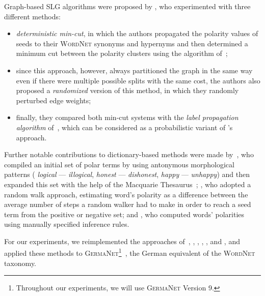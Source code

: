 Graph-based SLG algorithms were proposed by \citet{Rao:09}, who
experimented with three different methods:
\begin{itemize}
\item\emph{deterministic min-cut}, in which the authors propagated the
  polarity values of seeds to their \textsc{WordNet} synonyms and
  hypernyms and then determined a minimum cut between the polarity
  clusters using the algorithm of~\citet{Blum:01};
\item since this approach, however, always partitioned the graph in
  the same way even if there were multiple possible splits with the
  same cost, the authors also proposed a \emph{randomized} version of
  this method, in which they randomly perturbed edge weights;
\item finally, they compared both min-cut systems with the \emph{label
  propagation algorithm} of~\citet{Zhu:02}, which can be considered as
  a probabilistic variant of \citeauthor{Blair-Goldensohn:08}'s
  approach.
\end{itemize}

Further notable contributions to dictionary-based methods were made
by~\citet{Mohammad:09}, who compiled an initial set of polar terms by
using antonymous morphological patterns (\eg{} \emph{logical} ---
\emph{illogical}, \emph{honest} --- \emph{dishonest}, \emph{happy} ---
\emph{unhappy}) and then expanded this set with the help of the
Macquarie Thesaurus~\cite{Bernard:86}; \citet{Awadallah:10}, who
adopted a random walk approach, estimating word's polarity as a
difference between the average number of steps a random walker had to
make in order to reach a seed term from the positive or negative set;
and \citet{Dragut:10}, who computed words' polarities using manually
specified inference rules.


For our experiments, we reimplemented the approaches of~\citet{Hu:04},
\citet{Blair-Goldensohn:08}, \citet{Kim:04,Kim:06}, \citet{Esuli:06c},
\citet{Rao:09}, and \citet{Awadallah:10}, and applied these methods to
\textsc{GermaNet}\footnote{Throughout our experiments, we will use
  \textsc{GermaNet} Version 9.}~\cite{Hamp:97}, the German equivalent
of the \textsc{WordNet} taxonomy.

